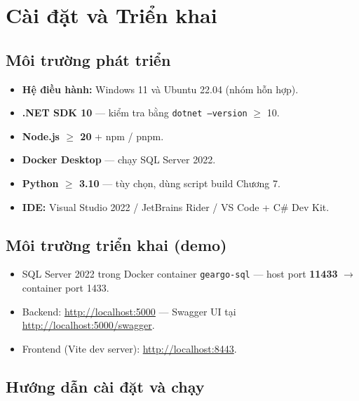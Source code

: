 \chapter{Cài đặt và Triển khai}
\label{chuong:cai_dat}

\section{Môi trường phát triển}
\label{sec:moi_truong_dev}

\begin{itemize}
  \item \textbf{Hệ điều hành:} Windows 11 và Ubuntu 22.04 (nhóm hỗn hợp).
  \item \textbf{.NET SDK 10} --- kiểm tra bằng \texttt{dotnet --version} $\geq$ 10.
  \item \textbf{Node.js $\geq$ 20} + npm / pnpm.
  \item \textbf{Docker Desktop} --- chạy SQL Server 2022.
  \item \textbf{Python $\geq$ 3.10} --- tùy chọn, dùng script build Chương 7.
  \item \textbf{IDE:} Visual Studio 2022 / JetBrains Rider / VS Code + C\# Dev Kit.
\end{itemize}

\section{Môi trường triển khai (demo)}
\label{sec:moi_truong_deploy}

\begin{itemize}
  \item SQL Server 2022 trong Docker container \texttt{geargo-sql} --- host port \textbf{11433} $\to$ container port 1433.
  \item Backend: \url{http://localhost:5000} --- Swagger UI tại \url{http://localhost:5000/swagger}.
  \item Frontend (Vite dev server): \url{http://localhost:8443}.
\end{itemize}

\section{Hướng dẫn cài đặt và chạy}
\label{sec:huong_dan_chay}

